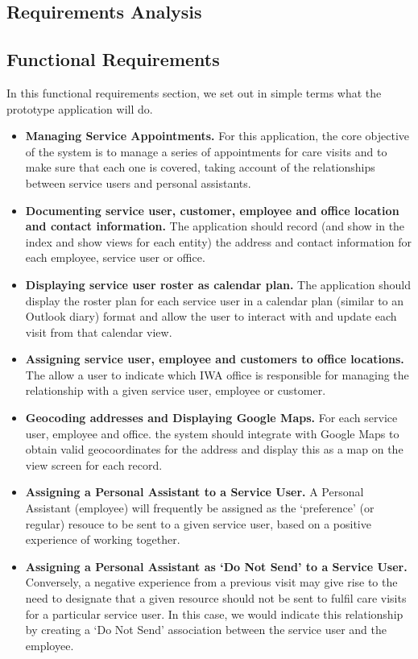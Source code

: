 \documentclass[a4paper,12pt]{article}
\begin{document}
\begin{samepage}
\section {Requirements Analysis}
\subsection {Functional Requirements }

In this functional requirements section, we set out in simple terms what the prototype application will do. 

\begin{itemize}

\item \textbf {Managing Service Appointments.} For this application, the core objective of the system is to manage a series of appointments for care visits and to make sure that each one is covered, taking account of the relationships between service users and personal assistants.
\item \textbf {Documenting service user, customer, employee and office location and contact information.} The application should record (and show in the index and show views for each entity) the address and contact information for each employee, service user or office.
\item \textbf {Displaying service user roster as calendar plan.} The application should display the roster plan for each service user in a calendar plan (similar to an Outlook diary) format and allow the user to interact with and update each visit from that calendar view.
\item \textbf {Assigning service user, employee and customers to office locations.} The allow a user to indicate which IWA office is responsible for managing the relationship with a given service user, employee or customer.
\item \textbf {Geocoding addresses and Displaying Google Maps.} For each service user, employee and office. the system should integrate with Google Maps to obtain valid geocoordinates for the address and display this as a map on the view screen for each record.
\item \textbf{Assigning a Personal Assistant to a Service User.} A Personal Assistant (employee) will frequently be assigned as the `preference' (or regular) resouce to be sent to a given service user, based on a positive experience of working together. 
\item \textbf{Assigning a Personal Assistant as `Do Not Send' to a Service User.} Conversely, a negative experience from a previous visit may give rise to the need to designate that a given resource should not be sent to fulfil care visits for a particular service user. In this case, we would indicate this relationship by creating a `Do Not Send' association between the service user and the employee.

\end{itemize}
\end{samepage}
\end{document}

